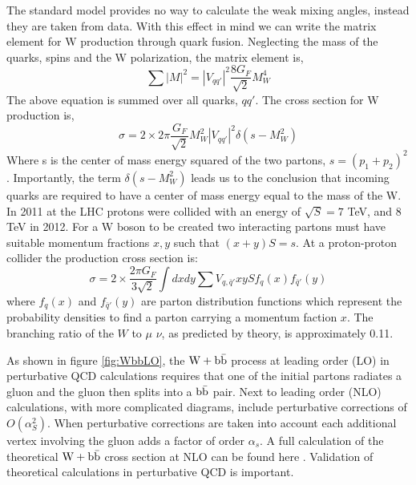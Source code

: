 The standard model provides no way to calculate the weak mixing angles, instead they
are taken from data.
With this effect in mind we can write the matrix element for W production through quark fusion.
Neglecting the mass of the quarks, spins and the W polarization, the matrix element is,
\begin{equation}
\sum|M|^{2}=|V_{qq'}|^{2}\frac{8G_{F}}{\sqrt{2}}M_{W}^{4}
\end{equation}
The above equation is summed over all quarks, $qq'$. The cross section for W production is,
\begin{equation}
\sigma=2\times2\pi\frac{G_{F}}{\sqrt{2}}M_{W}^{2}|V_{qq'}|^{2}\delta(s-M_{W}^{2})
\end{equation}
Where s is the center of mass energy squared of the two partons, $s=(p_{1}+p_{2})^{2}$.
Importantly, the term $\delta(s-M_{W}^{2})$ leads us to the 
conclusion that incoming quarks are required to have a center of mass energy
equal to the mass of the W. 
In 2011 at the LHC protons were collided with an energy of $\sqrt{S}=7$ TeV, and 8 TeV in 2012.
For a W boson to be created two interacting partons must have suitable
momentum fractions $x, y$ such that $(x+y)S=s$.
At a proton-proton collider the production cross section is:
\begin{equation}
\sigma=2\times\frac{2\pi G_{F}}{3\sqrt{2}}\int{dxdy \sum{V_{q,\bar{q}'}}xyS f_{q}(x)f_{\bar{q}'}(y)}
\end{equation}
where $f_{q}(x)$ and $f_{\bar{q}'}(y)$ are parton distribution functions which 
represent the probability densities to find a parton carrying
 a momentum faction $x$.
The branching ratio of the $W$ to $\mu$ $\nu$, as predicted by theory, is approximately 0.11. 

As shown in figure \ref{fig:WbbLO}, the $\mathrm{W+\mathrm{b\bar{b}}}$ process at 
leading order (LO) in perturbative QCD calculations requires that one of the initial partons
radiates a gluon and the gluon then splits into a $\mathrm{b\bar{b}}$ pair. 
Next to leading order (NLO) calculations, with more complicated diagrams,
 include perturbative corrections of $O(\alpha_{S}^{2})$. 
When perturbative corrections are taken into account each additional
vertex involving the gluon adds a factor of order $\alpha_{s}$. A full
calculation of the theoretical $\mathrm{W+\mathrm{b\bar{b}}}$ cross section at 
NLO can be found here \cite{Campbell:2010ff, Badger:2010mg}.
Validation of theoretical calculations in perturbative QCD is important.

